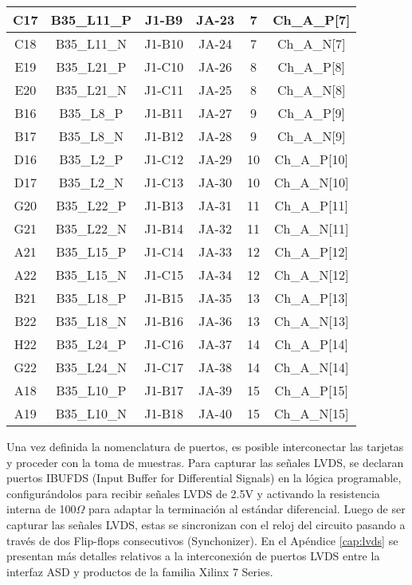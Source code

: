 \begin{table}[]
{\begin{tabular}{|c|c|c|c|c|c|}
				\rowcolor[HTML]{D9E1F2} 
				C17 & B35\_L11\_P & J1-B9  & JA-23 & 7  & Ch\_A\_P{[}7{]}  \\ \hline
				C18 & B35\_L11\_N & J1-B10 & JA-24 & 7  & Ch\_A\_N{[}7{]}  \\ \hline
				\rowcolor[HTML]{D9E1F2} 
				E19 & B35\_L21\_P & J1-C10 & JA-26 & 8  & Ch\_A\_P{[}8{]}  \\ \hline
				E20 & B35\_L21\_N & J1-C11 & JA-25 & 8  & Ch\_A\_N{[}8{]}  \\ \hline
				\rowcolor[HTML]{D9E1F2} 
				B16 & B35\_L8\_P  & J1-B11 & JA-27 & 9  & Ch\_A\_P{[}9{]}  \\ \hline
				B17 & B35\_L8\_N  & J1-B12 & JA-28 & 9  & Ch\_A\_N{[}9{]}  \\ \hline
				\rowcolor[HTML]{D9E1F2} 
				D16 & B35\_L2\_P  & J1-C12 & JA-29 & 10 & Ch\_A\_P{[}10{]} \\ \hline
				D17 & B35\_L2\_N  & J1-C13 & JA-30 & 10 & Ch\_A\_N{[}10{]} \\ \hline
				\rowcolor[HTML]{D9E1F2} 
				G20 & B35\_L22\_P & J1-B13 & JA-31 & 11 & Ch\_A\_P{[}11{]} \\ \hline
				G21 & B35\_L22\_N & J1-B14 & JA-32 & 11 & Ch\_A\_N{[}11{]} \\ \hline
				\rowcolor[HTML]{D9E1F2} 
				A21 & B35\_L15\_P & J1-C14 & JA-33 & 12 & Ch\_A\_P{[}12{]} \\ \hline
				A22 & B35\_L15\_N & J1-C15 & JA-34 & 12 & Ch\_A\_N{[}12{]} \\ \hline
				\rowcolor[HTML]{D9E1F2} 
				B21 & B35\_L18\_P & J1-B15 & JA-35 & 13 & Ch\_A\_P{[}13{]} \\ \hline
				B22 & B35\_L18\_N & J1-B16 & JA-36 & 13 & Ch\_A\_N{[}13{]} \\ \hline
				\rowcolor[HTML]{D9E1F2} 
				H22 & B35\_L24\_P & J1-C16 & JA-37 & 14 & Ch\_A\_P{[}14{]} \\ \hline
				G22 & B35\_L24\_N & J1-C17 & JA-38 & 14 & Ch\_A\_N{[}14{]} \\ \hline
				\rowcolor[HTML]{D9E1F2} 
				A18 & B35\_L10\_P & J1-B17 & JA-39 & 15 & Ch\_A\_P{[}15{]} \\ \hline
				A19 & B35\_L10\_N & J1-B18 & JA-40 & 15 & Ch\_A\_N{[}15{]} \\ \hline
			\end{tabular}%
		}
		\label{tab:zynq-asd}
	\end{table}
	
	Una vez definida la nomenclatura de puertos, es posible interconectar las tarjetas y proceder con la toma de muestras. Para capturar las señales LVDS, se declaran puertos IBUFDS (Input Buffer for Differential Signals) \cite{Xilinx2012XilinxDesigns} en la lógica programable, configurándolos para recibir señales LVDS de 2.5V y activando la resistencia interna de 100$\Omega$ para adaptar la terminación al estándar diferencial. Luego de ser capturar las señales LVDS, estas se sincronizan con el reloj del circuito pasando a través de dos Flip-flops consecutivos (Synchonizer). En el Apéndice \ref{cap:lvds} se presentan más detalles relativos a la interconexión de puertos LVDS entre la interfaz ASD y productos de la familia Xilinx 7 Series.
	
